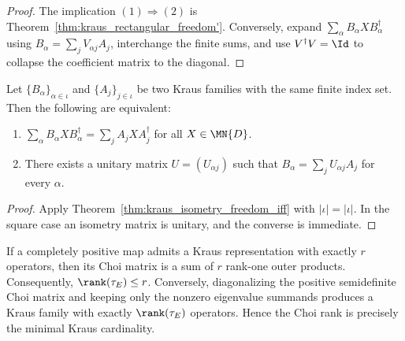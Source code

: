 \begin{proof}
    \leanok
    The implication $(1) \Rightarrow (2)$ is
    Theorem~\ref{thm:kraus_rectangular_freedom'}.
    Conversely, expand $\sum_\alpha B_\alpha X B_\alpha^\dagger$ using
    $B_\alpha = \sum_j V_{\alpha j} A_j$, interchange the finite sums,
    and use $V^\dagger V = \Id$ to collapse the coefficient matrix to the
    diagonal.
\end{proof}

\begin{theorem}
    \label{thm:kraus_unitary_freedom_iff}
    \leanok
    Let $\{B_\alpha\}_{\alpha \in \iota}$ and $\{A_j\}_{j \in \iota}$
    be two Kraus families with the same finite index set.
    Then the following are equivalent:
    \begin{enumerate}
        \item $\sum_\alpha B_\alpha X B_\alpha^\dagger
                  = \sum_j A_j X A_j^\dagger$ for all $X \in \MN{D}$.
        \item There exists a unitary matrix $U = (U_{\alpha j})$ such that
              $B_\alpha = \sum_j U_{\alpha j} A_j$ for every $\alpha$.
    \end{enumerate}
\end{theorem}

\begin{proof}
    \leanok
    Apply Theorem~\ref{thm:kraus_isometry_freedom_iff} with
    $|\iota| = |\iota|$.
    In the square case an isometry matrix is unitary, and the converse is
    immediate.
\end{proof}

\begin{remark}
    \label{rem:choi_rank_eq_min_kraus_cardinality}
    \leanok
    If a completely positive map admits a Kraus representation with exactly $r$
    operators, then its Choi matrix is a sum of $r$ rank-one outer products.
    Consequently, $\rank(\tau_E) \le r$.
    Conversely, diagonalizing the positive semidefinite Choi matrix and keeping
    only the nonzero eigenvalue summands produces a Kraus family with exactly
    $\rank(\tau_E)$ operators. Hence the Choi rank is precisely
    the minimal Kraus cardinality.
\end{remark}

